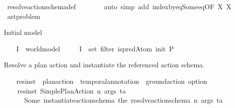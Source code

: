 \begin{isabellebody}
\ resolve{\isacharunderscore}{\kern0pt}action{\isacharunderscore}{\kern0pt}schema{\isacharunderscore}{\kern0pt}def\isanewline
\ \ \ \ \ \ \isamarkupfalse%
\ {\isacharparenleft}{\kern0pt}auto\ simp\ add{\isacharcolon}{\kern0pt}\ index{\isacharunderscore}{\kern0pt}by{\isacharunderscore}{\kern0pt}eq{\isacharunderscore}{\kern0pt}Some{\isacharunderscore}{\kern0pt}eq{\isacharbrackleft}{\kern0pt}OF\ X{}{\isacharbrackright}{\kern0pt}\ X{}{\isacharparenright}{\kern0pt}\isanewline
\ \ \isamarkupfalse%
%
\endisatagproof
{\isafoldproof}%
%
\isadelimproof
\isanewline
%
\endisadelimproof
\isanewline
{}\isamarkupfalse%
\ %
\isanewline
\isanewline
{}\isamarkupfalse%
\ ast{\isacharunderscore}{\kern0pt}problem\ %
\begin{isamarkuptext}%
Initial model%
\end{isamarkuptext}\isamarkuptrue%
\ \ \isamarkupfalse%
\ I\ {\isacharcolon}{\kern0pt}{\isacharcolon}{\kern0pt}\ {\isachardoublequoteopen}world{\isacharunderscore}{\kern0pt}model{\isachardoublequoteclose}\ \isanewline
\ \ \ \ {\isachardoublequoteopen}I\ {\isasymequiv}\ set\ {\isacharparenleft}{\kern0pt}filter\ is{\isacharunderscore}{\kern0pt}predAtom\ {\isacharparenleft}{\kern0pt}init\ P{\isacharparenright}{\kern0pt}{\isacharparenright}{\kern0pt}{\isachardoublequoteclose}%
\begin{isamarkuptext}%
Resolve a plan action and instantiate the referenced action schema.%
\end{isamarkuptext}\isamarkuptrue%
\ \ \isamarkupfalse%
\ res{\isacharunderscore}{\kern0pt}inst\ {\isacharcolon}{\kern0pt}{\isacharcolon}{\kern0pt}\ {\isachardoublequoteopen}plan{\isacharunderscore}{\kern0pt}action\ {\isasymRightarrow}\ temporal{\isacharunderscore}{\kern0pt}annotation\ {\isasymRightarrow}\ ground{\isacharunderscore}{\kern0pt}action\ option{\isachardoublequoteclose}\ \isanewline
\ \ \ \ {\isachardoublequoteopen}res{\isacharunderscore}{\kern0pt}inst\ {\isacharparenleft}{\kern0pt}Simple{\isacharunderscore}{\kern0pt}Plan{\isacharunderscore}{\kern0pt}Action\ n\ args{\isacharparenright}{\kern0pt}\ ta\ {\isacharequal}{\kern0pt}\isanewline
\ \ \ \ \ \ Some\ {\isacharparenleft}{\kern0pt}instantiate{\isacharunderscore}{\kern0pt}action{\isacharunderscore}{\kern0pt}schema\ {\isacharparenleft}{\kern0pt}the\ {\isacharparenleft}{\kern0pt}resolve{\isacharunderscore}{\kern0pt}action{\isacharunderscore}{\kern0pt}schema\ n{\isacharparenright}{\kern0pt}{\isacharparenright}{\kern0pt}\ args\ ta{\isacharparenright}{\kern0pt}{\isachardoublequoteclose}\isanewline

\end{isabellebody}
